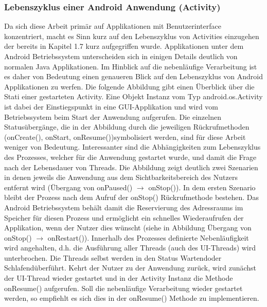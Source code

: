 \documentclass[12pt,oneside,a4paper,bibtotoc,liststotoc]{scrreprt}
\begin{document}
\subsubsection{Lebenszyklus einer Android Anwendung (Activity)}
Da sich diese Arbeit primär auf Applikationen mit Benutzerinterface konzentriert, macht es Sinn kurz auf den Lebenszyklus von Activities einzugehen der bereits in Kapitel 1.7 kurz aufgegriffen wurde.
Applikationen unter dem Android Betriebssystem unterscheiden sich in einigen Details deutlich von normalen Java Applikationen. Im Hinblick auf die nebenläufige Verarbeitung ist es daher von Bedeutung einen genaueren Blick auf den Lebenszyklus von Android Applikationen zu werfen. Die folgende Abbildung gibt einen Überblick über die Stati einer gestarteten Activity. Eine Objekt Instanz vom Typ android.os.Activity ist dabei der Einstiegspunkt in eine GUI-Applikation und wird vom Betriebssystem beim Start der Anwendung aufgerufen. Die einzelnen Statusübergänge, die in der Abbildung durch die jeweiligen Rückrufmethoden (onCreate(), onStart, onResume())symbolisiert werden,  sind für diese Arbeit weniger von Bedeutung. Interessanter sind die Abhängigkeiten zum Lebenszyklus des Prozesses, welcher für die Anwendung gestartet wurde, und damit die Frage nach der Lebensdauer von Threads. Die Abbildung zeigt deutlich zwei Szenarien in denen jeweils die Anwendung aus dem Sichtbarkeitsbereich des Nutzers entfernt wird (Übergang von onPaused() $\rightarrow$  onStop()). In dem ersten Szenario bleibt der Prozess nach dem Aufruf der onStop() Rückrufmethode bestehen. Das Android Betriebssystem behält damit die Reservierung des Adressraums im Speicher für diesen Prozess und ermöglicht ein schnelles Wiederaufrufen der Applikation, wenn der Nutzer dies wünscht (siehe in Abbildung Übergang von onStop() $\rightarrow$   onRestart()). Innerhalb des Prozesses definierte Nebenläufigkeit wird angehalten, d.h. die Ausführung aller Threads (auch des UI-Threads) wird unterbrochen. Die Threads selbst werden in den Status \glqq Wartend\grqq oder \glqq Schlafend\grqq überführt. Kehrt der Nutzer zu der Anwendung zurück, wird zunächst der UI-Thread wieder gestartet und in der Activity Instanz die Methode onResume() aufgerufen. Soll die nebenläufige Verarbeitung wieder gestartet werden, so empfiehlt es sich dies in der onResume() Methode zu implementieren.
\end{document}
